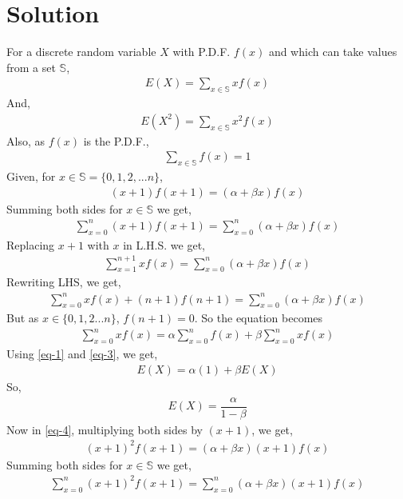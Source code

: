 \documentclass[journal,12pt,twocolumn]{IEEEtran}
\begin{document}
\section{Solution}
For a discrete random variable $X$ with P.D.F. $f(x)$ and which can take values from a set $\mathbb{S}$,
\begin{align} \label{eq-1}
    E(X)= \sum_{x \in \mathbb{S}}xf(x)
\end{align}
And,
\begin{align} \label{eq-2}
    E(X^2) =\sum_{x \in \mathbb{S}}x^2f(x)
\end{align}
Also, as $f(x)$ is the P.D.F.,
\begin{align} \label{eq-3}
    \sum_{x \in \mathbb{S}}f(x) = 1
\end{align}
Given, for $x \in \mathbb{S}=\{0,1,2,...n\}$,
\begin{align} \label{eq-4}
    (x+1)f(x+1)=(\alpha + \beta x)f(x)
\end{align}
Summing both sides for $x \in \mathbb{S}$ we get,
\begin{align}
    \sum_{x=0}^n(x+1)f(x+1)=\sum_{x=0}^n(\alpha +\beta x)f(x)
\end{align}
Replacing $x+1$ with $x$ in L.H.S. we get, 
\begin{align}
    \sum_{x=1}^{n+1}xf(x)=\sum_{x=0}^n(\alpha +\beta x)f(x)
\end{align}
Rewriting LHS, we get,
\begin{align}
    \sum_{x=0}^nxf(x)+(n+1)f(n+1)=\sum_{x=0}^n(\alpha +\beta x)f(x)
\end{align}
But as $x \in \{0,1,2...n\}$, $f(n+1)=0$. So the equation becomes
\begin{align}
    \sum_{x=0}^nxf(x)=\alpha \sum_{x=0}^nf(x) + \beta \sum_{x=0}^nxf(x)
\end{align}
Using \eqref{eq-1} and \eqref{eq-3}, we get,
\begin{align} 
    E(X)=\alpha(1) + \beta E(X)
\end{align}
So,
\begin{align} \label{eq-5}
    E(X)=\dfrac{\alpha}{1-\beta}
\end{align}
Now in \eqref{eq-4}, multiplying both sides by $(x+1)$, we get,
\begin{align}
    (x+1)^2f(x+1)=(\alpha + \beta x)(x+1)f(x)
\end{align}
Summing both sides for $x \in \mathbb{S}$ we get,
\begin{align}
    \sum_{x=0}^n(x+1)^2f(x+1)=\sum_{x=0}^n(\alpha +\beta x)(x+1)f(x)
\end{align}
\end{document}
